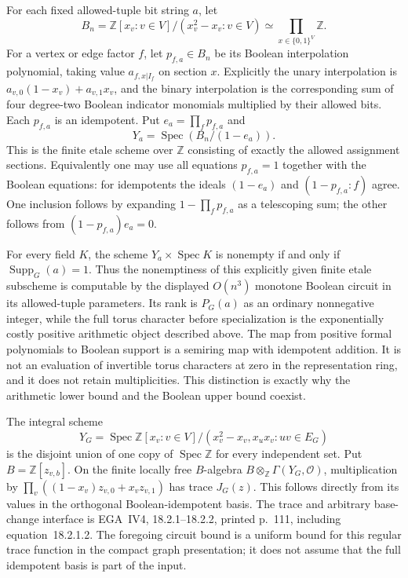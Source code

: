 \begin{geometricstatement}[NN-S019]
For each fixed allowed-tuple bit string $a$, let
\[
 B_n=\mathbb Z[x_v:v\in V]/(x_v^2-x_v:v\in V)
                   \simeq\prod_{x\in\{0,1\}^V}\mathbb Z.
\]
For a vertex or edge factor $f$, let $p_{f,a}\in B_n$ be its
Boolean interpolation polynomial, taking value $a_{f,x|I_f}$
on section $x$.  Explicitly the unary interpolation is
$a_{v,0}(1-x_v)+a_{v,1}x_v$, and the binary interpolation is
the corresponding sum of four degree-two Boolean indicator
monomials multiplied by their allowed bits.  Each $p_{f,a}$
is an idempotent.  Put $e_a=\prod_f p_{f,a}$ and
\[
                 Y_a=\operatorname{Spec}(B_n/(1-e_a)).
\]
This is the finite etale scheme over $\mathbb Z$ consisting of
exactly the allowed assignment sections.  Equivalently one may
use all equations $p_{f,a}=1$ together with the Boolean equations:
for idempotents the ideals $(1-e_a)$ and $(1-p_{f,a}:f)$ agree.
One inclusion follows by expanding $1-\prod_f p_{f,a}$ as a
telescoping sum; the other follows from
$(1-p_{f,a})e_a=0$.

For every field $K$, the scheme $Y_a\times\operatorname{Spec}K$
is nonempty if and only if $\operatorname{Supp}_G(a)=1$.
Thus the nonemptiness of this explicitly given finite etale
subscheme is computable by the displayed $O(n^3)$ monotone
Boolean circuit in its allowed-tuple parameters.  Its rank is
$P_G(a)$ as an ordinary nonnegative integer, while the full
torus character before specialization is the exponentially
costly positive arithmetic object described above.  The map
from positive formal polynomials to Boolean support is a
semiring map with idempotent addition.  It is not an evaluation
of invertible torus characters at zero in the representation
ring, and it does not retain multiplicities.  This distinction
is exactly why the arithmetic lower bound and the Boolean
upper bound coexist.

The integral scheme
\[
 Y_G=\operatorname{Spec}
 \mathbb Z[x_v:v\in V]/
           (x_v^2-x_v, x_ux_v:uv\in E_G)
\]
is the disjoint union of one copy of $\operatorname{Spec}\mathbb Z$
for every independent set.  Put $B=\mathbb Z[z_{v,b}]$.
On the finite locally free $B$-algebra
$B\otimes_{\mathbb Z}\Gamma(Y_G,\mathcal O)$, multiplication
by $\prod_v((1-x_v)z_{v,0}+x_vz_{v,1})$ has trace $J_G(z)$.
This follows directly from its values in the orthogonal
Boolean-idempotent basis.  The trace and arbitrary base-change
interface is EGA~IV4, 18.2.1--18.2.2, printed p.~111, including
equation~18.2.1.2.  The foregoing circuit bound is a uniform
bound for this regular trace function in the compact graph
presentation; it does not assume that the full idempotent
basis is part of the input.


\end{geometricstatement}
